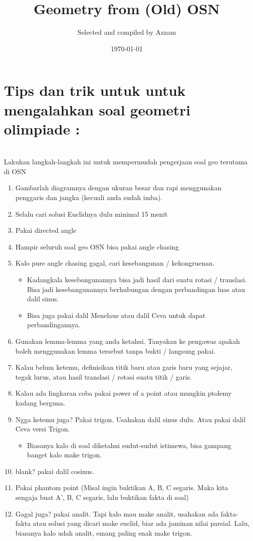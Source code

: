 \documentclass[12pt]{scrartcl}
\title{Geometry from (Old) OSN}
\author{Selected and compiled by Azzam}
\date{\today}
\begin{document}
	\maketitle

\renewcommand*\contentsname{Daftar Isi}
\tableofcontents

\newpage
	\section{Tips dan trik untuk untuk mengalahkan soal geometri olimpiade :}
	\\Lakukan langkah-langkah ini untuk mempermudah pengerjaan soal geo terutama di OSN
	\begin{enumerate}
		\item
		Gambarlah diagramnya dengan ukuran besar dan rapi menggunakan penggaris dan jangka (kecuali anda sudah imba).
		\item
		Selalu cari solusi Euclidnya dulu minimal 15 menit
		\item
		Pakai directed angle
		\item
		Hampir seluruh soal geo OSN bisa pakai angle chasing
		\item
		Kalo pure angle chasing gagal, cari kesebangunan / kekongruenan. 
		\begin{itemize}
			\item
			Kadangkala kesebangunannya bisa jadi hasil dari suatu rotasi / translasi. Bisa jadi kesebangunannya berhubungan dengan perbandingan luas atau dalil sinus.
			\item
			Bisa juga pakai dalil Menelaus atau dalil Ceva untuk dapat perbandingannya.
		\end{itemize}
		\item
		Gunakan lemma-lemma yang anda ketahui. Tanyakan ke pengawas apakah boleh menggunakan lemma tersebut tanpa bukti / langsung pakai.
		\item
		Kalau belum ketemu, definisikan titik baru atau garis baru yang sejajar, tegak lurus, atau hasil translasi / rotasi suatu titik / garis.
		
		\item
		Kalau ada lingkaran coba pakai power of a point atau mungkin ptolemy kadang berguna.
		
		
		\item
		Ngga ketemu juga? Pakai trigon. Usahakan dalil sinus dulu. Atau pakai dalil Ceva versi Trigon.
		\begin{itemize}
			\item
			Biasanya kalo di soal diketahui sudut-sudut istimewa, bisa gampang banget kalo make trigon.
		\end{itemize}
		\item
		blank? pakai dalil cosinus.
		\item
		Pakai phantom point (Misal ingin buktikan A, B, C segaris. Maka kita sengaja buat A', B, C segaris, lalu buktikan fakta di soal)
		\item
		Gagal juga? pakai analit. Tapi kalo mau make analit, usahakan ada fakta-fakta atau solusi yang dicari make euclid, biar ada jaminan nilai parsial. Lalu, biasanya kalo udah analit, emang paling enak make trigon.
	
	\end{enumerate}
	
\end{document}
